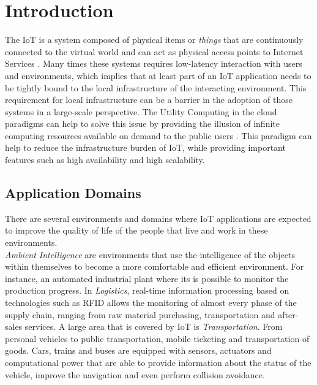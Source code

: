 

\section{Introduction}
\label{sec:introduction}
The \gls{IoT} is a system composed of physical items or \textit{things} that are continuously
connected to the virtual world and can act as physical access points to Internet Services \cite{mattern2010internet}.
Many times these systems requires low-latency interaction with users and environments, which implies
that at least part of an \gls{IoT} application needs to be tightly bound to the local infrastructure
of the interacting environment. This requirement for local infrastructure can be a barrier in the
adoption of those systems in a large-scale perspective. The Utility Computing in the cloud paradigms
can help to solve this issue by providing the illusion of infinite computing resources available on
demand to the public users \cite{armbrust2010view}. This paradigm can help to reduce the infrastructure
burden of \gls{IoT}, while providing important features such as high availability and high scalability.

\subsection{Application Domains}
\label{sub:application_domains}
There are several environments and domains where \gls{IoT} applications are expected
to improve the quality of life of the people that live and work in these environments.\\

\textit{Ambient Intelligence} are environments that use the intelligence of the objects within
themselves to become a more comfortable and efficient environment. For instance, an automated industrial
plant where its is possible to monitor the production progress.
In \textit{Logistics}, real-time information processing based on technologies such as \gls{RFID} allows the
monitoring of almost every phase of the supply chain, ranging from raw material purchasing, transportation
and after-sales services.
A large area that is covered by \gls{IoT} is \textit{Transportation}. From personal vehicles to public
transportation, mobile ticketing and transportation of goods. Cars, trains and buses are equipped with
sensors, actuators and computational power that are able to provide information about the status of
the vehicle, improve the navigation and even perform collision avoidance.\\

